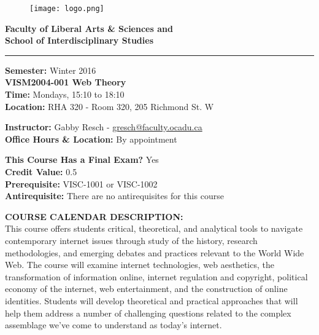 \documentclass[10pt]{article}
\begin{document}
\begin{figure}
	\raggedleft
	\texttt{[image: logo.png]}
\end{figure}

\textbf{\LARGE{Faculty of Liberal Arts \& Sciences and \\
School of Interdisciplinary Studies}}\newline
\rule{\textwidth}{1pt}

\textbf{Semester:} Winter 2016\\
\textbf{VISM2004-001 Web Theory}\\
\textbf{Time:} Mondays, 15:10 to 18:10\\
\textbf{Location:} RHA 320 - Room 320, 205 Richmond St. W

\textbf{Instructor:} Gabby Resch - \href{mailto:gresch@faculty.ocadu.ca}{gresch@faculty.ocadu.ca}\\
\textbf{Office Hours \& Location:} By appointment

\textbf{This Course Has a Final Exam?} Yes\\
\textbf{Credit Value:} 0.5\\
\textbf{Prerequisite:} VISC-1001 or VISC-1002\\
\textbf{Antirequisite:} There are no antirequisites for this course

\textbf{COURSE CALENDAR DESCRIPTION:}\\
This course offers students critical, theoretical, and analytical tools to navigate contemporary internet issues through study of the history, research methodologies, and emerging debates and practices relevant to the World Wide Web. The course will examine internet technologies, web aesthetics, the transformation of information online, internet regulation and copyright, political economy of the internet, web entertainment, and the construction of online identities. Students will develop theoretical and practical approaches that will help them address a number of challenging questions related to the complex assemblage we've come to understand as today's internet.
\end{document}
